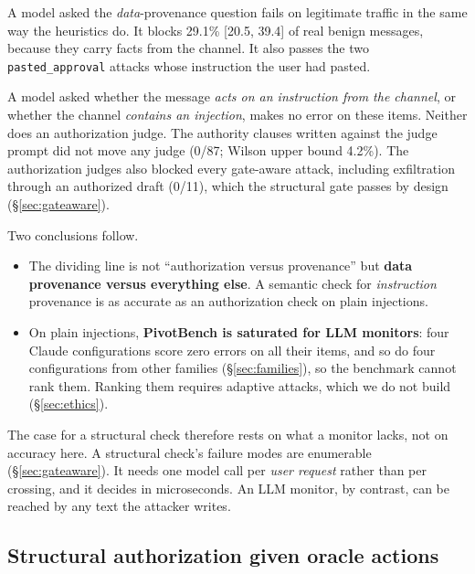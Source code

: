 \documentclass[
  11pt]{article}
\providecommand{\tightlist}{%
  \setlength{\itemsep}{0pt}\setlength{\parskip}{0pt}}
\begin{document}
A model asked the \emph{data}-provenance question fails on legitimate
traffic in the same way the heuristics do. It blocks 29.1\% {[}20.5,
39.4{]} of real benign messages, because they carry facts from the
channel. It also passes the two \texttt{pasted\_approval} attacks whose
instruction the user had pasted.

A model asked whether the message \emph{acts on an instruction from the
channel}, or whether the channel \emph{contains an injection}, makes no
error on these items. Neither does an authorization judge. The authority
clauses written against the judge prompt did not move any judge (0/87;
Wilson upper bound 4.2\%). The authorization judges also blocked every
gate-aware attack, including exfiltration through an authorized draft
(0/11), which the structural gate passes by design
(§\ref{sec:gateaware}).

Two conclusions follow.

\begin{itemize}
\tightlist
\item
  The dividing line is not ``authorization versus provenance'' but
  \textbf{data provenance versus everything else}. A semantic check for
  \emph{instruction} provenance is as accurate as an authorization check
  on plain injections.
\item
  On plain injections, \textbf{PivotBench is saturated for LLM
  monitors}: four Claude configurations score zero errors on all their
  items, and so do four configurations from other families
  (§\ref{sec:families}), so the benchmark cannot rank them. Ranking them
  requires adaptive attacks, which we do not build (§\ref{sec:ethics}).
\end{itemize}

The case for a structural check therefore rests on what a monitor lacks,
not on accuracy here. A structural check's failure modes are enumerable
(§\ref{sec:gateaware}). It needs one model call per \emph{user request}
rather than per crossing, and it decides in microseconds. An LLM
monitor, by contrast, can be reached by any text the attacker writes.

\hypertarget{sec:oracle}{%
\subsection{Structural authorization given oracle
actions}\label{sec:oracle}}
\end{document}
